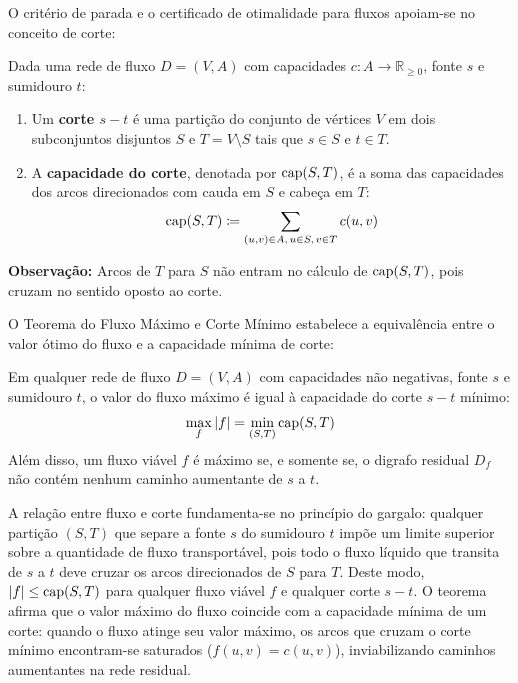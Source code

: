 O critério de parada e o certificado de otimalidade para fluxos apoiam-se no conceito de corte:

\begin{definicao}
Dada uma rede de fluxo $D = (V, A)$ com capacidades $c: A \to \mathbb{R}_{\ge 0}$, fonte $s$ e sumidouro $t$:
\begin{enumerate}
    \item Um \textbf{corte $s-t$} é uma partição do conjunto de vértices $V$ em dois subconjuntos disjuntos $S$ e $T = V \setminus S$ tais que $s \in S$ e $t \in T$.
    \item A \textbf{capacidade do corte}, denotada por $\operatorname{cap}(S, T)$, é a soma das capacidades dos arcos direcionados com cauda em $S$ e cabeça em $T$:
    \begin{equation}
        \operatorname{cap}(S, T) \coloneqq \sum_{(u,v) \in A, \, u \in S, \, v \in T} c(u,v)
    \end{equation}
\end{enumerate}
\textbf{Observação:} Arcos de $T$ para $S$ não entram no cálculo de $\operatorname{cap}(S, T)$, pois cruzam no sentido oposto ao corte.
\end{definicao}

O Teorema do Fluxo Máximo e Corte Mínimo estabelece a equivalência entre o valor ótimo do fluxo e a capacidade mínima de corte:

\begin{teorema}
Em qualquer rede de fluxo $D = (V, A)$ com capacidades não negativas, fonte $s$ e sumidouro $t$, o valor do fluxo máximo é igual à capacidade do corte $s-t$ mínimo:
\begin{equation}
    \max_f |f| = \min_{(S,T)} \operatorname{cap}(S,T)
\end{equation}
Além disso, um fluxo viável $f$ é máximo se, e somente se, o digrafo residual $D_f$ não contém nenhum caminho aumentante de $s$ a $t$.
\end{teorema}

 A relação entre fluxo e corte fundamenta-se no princípio do gargalo: qualquer partição $(S, T)$ que separe a fonte $s$ do sumidouro $t$ impõe um limite superior sobre a quantidade de fluxo transportável, pois todo o fluxo líquido que transita de $s$ a $t$ deve cruzar os arcos direcionados de $S$ para $T$. Deste modo, $|f| \le \operatorname{cap}(S, T)$ para qualquer fluxo viável $f$ e qualquer corte $s-t$. O teorema afirma que o valor máximo do fluxo coincide com a capacidade mínima de um corte: quando o fluxo atinge seu valor máximo, os arcos que cruzam o corte mínimo encontram-se saturados ($f(u,v) = c(u,v)$), inviabilizando caminhos aumentantes na rede residual.


